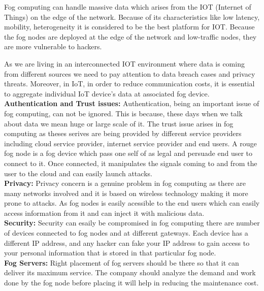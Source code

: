 \documentclass[10pt]{llncs}
\begin{document}
Fog computing can handle massive data which arises from the IOT (Internet of Things) on the edge of the network. Because of its characteristics like low latency, mobility, heterogeneity it is considered to be the best platform for IOT. Because the fog nodes are deployed at the edge of the network and low-traffic nodes, they are more vulnerable to hackers. 

As we are living in an interconnected IOT environment where data is coming from different  sources we need to pay attention to data breach cases and privacy threats. Moreover, in IoT, in order to reduce communication costs, it is essential to aggregate individual IoT device’s data at associated fog device.\\

\textbf{Authentication and Trust issues:} Authentication, being an important issue of fog computing, can not be ignored. This is because, these days when we talk about data we mean huge or large scale of it. The trust issue arises in fog computing as theses serives are being provided by different service providers including cloud service provider, internet service provider and end users. A rouge fog node is a fog device which pass one self of as legal and persuade end user to connect to it. Once connected, it manipulates the signals coming to and from the user to the cloud and can easily launch attacks.\\

\textbf{Privacy:} Privacy concern is a genuine problem in fog computing as there are many networks involved and it is based on wireless technology making it more prone to attacks. As fog nodes is easily acessible to the end users which can easily access information from it and can inject it with malicious data.\\

\textbf{Security:} Security can esaily be compromised in fog computing there are number of devices connected to fog nodes and at different gateways. Each device has a different IP address, and any hacker can fake your IP address to gain access to your personal information that is stored in that particular fog node.\\

\textbf{Fog Servers:} Right placement of fog servers should be there so that it can deliver its maximum service. The company should analyze the demand and work done by the fog node before placing it will help in reducing the maintenance cost.\\
\end{document}
